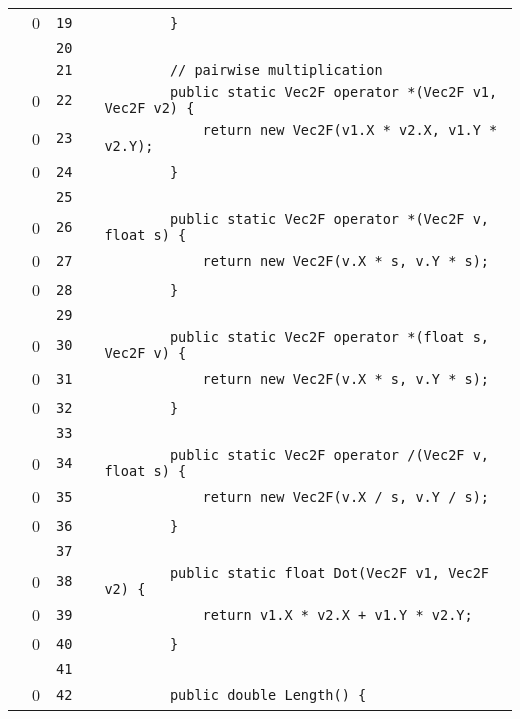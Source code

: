 \documentclass[a4paper,landscape,10pt]{article}
\begin{document}
\begin{longtable}[l]{lrrll}
\cellcolor{red} & 0 & \verb~19~ & & \verb~        }~\\
\cellcolor{gray} &  & \verb~20~ & & \verb~~\\
\cellcolor{gray} &  & \verb~21~ & & \verb~        // pairwise multiplication~\\
\cellcolor{red} & 0 & \verb~22~ & & \verb~        public static Vec2F operator *(Vec2F v1, Vec2F v2) {~\\
\cellcolor{red} & 0 & \verb~23~ & & \verb~            return new Vec2F(v1.X * v2.X, v1.Y * v2.Y);~\\
\cellcolor{red} & 0 & \verb~24~ & & \verb~        }~\\
\cellcolor{gray} &  & \verb~25~ & & \verb~~\\
\cellcolor{red} & 0 & \verb~26~ & & \verb~        public static Vec2F operator *(Vec2F v, float s) {~\\
\cellcolor{red} & 0 & \verb~27~ & & \verb~            return new Vec2F(v.X * s, v.Y * s);~\\
\cellcolor{red} & 0 & \verb~28~ & & \verb~        }~\\
\cellcolor{gray} &  & \verb~29~ & & \verb~~\\
\cellcolor{red} & 0 & \verb~30~ & & \verb~        public static Vec2F operator *(float s, Vec2F v) {~\\
\cellcolor{red} & 0 & \verb~31~ & & \verb~            return new Vec2F(v.X * s, v.Y * s);~\\
\cellcolor{red} & 0 & \verb~32~ & & \verb~        }~\\
\cellcolor{gray} &  & \verb~33~ & & \verb~~\\
\cellcolor{red} & 0 & \verb~34~ & & \verb~        public static Vec2F operator /(Vec2F v, float s) {~\\
\cellcolor{red} & 0 & \verb~35~ & & \verb~            return new Vec2F(v.X / s, v.Y / s);~\\
\cellcolor{red} & 0 & \verb~36~ & & \verb~        }~\\
\cellcolor{gray} &  & \verb~37~ & & \verb~~\\
\cellcolor{red} & 0 & \verb~38~ & & \verb~        public static float Dot(Vec2F v1, Vec2F v2) {~\\
\cellcolor{red} & 0 & \verb~39~ & & \verb~            return v1.X * v2.X + v1.Y * v2.Y;~\\
\cellcolor{red} & 0 & \verb~40~ & & \verb~        }~\\
\cellcolor{gray} &  & \verb~41~ & & \verb~~\\
\cellcolor{red} & 0 & \verb~42~ & & \verb~        public double Length() {~\\

\end{longtable}
\end{document}
